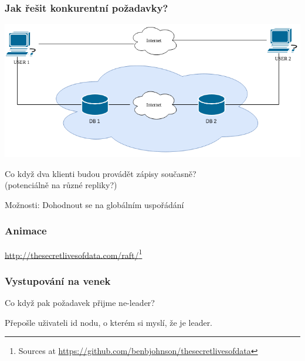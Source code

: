 \documentclass[usenames,dvipsnames,9pt]{beamer}
\begin{document}
\begin{frame}
  \frametitle{Jak řešit konkurentní požadavky?}

  \begin{center}
    \includegraphics[width=0.8\linewidth]{12/figs/pdv_cloud.png}

    \vspace{2em}

    {\Large Co když dva klienti budou provádět zápisy současně?} \\
    (potenciálně na různé repliky?)
  \end{center}

  Možnosti: \hspace{10pt} Dohodnout se na globálním uspořádání

  \pause
  \hspace{50pt}           %
\end{frame}

\begin{frame}
  \frametitle{Animace}
  \begin{center}
      \url{http://thesecretlivesofdata.com/raft/}\footnote{Sources at \url{https://github.com/benbjohnson/thesecretlivesofdata}}
  \end{center}
\end{frame}

\begin{frame}
  \frametitle{Vystupování na venek}
  \begin{center}
    \Large Co když pak požadavek přijme ne-leader?
    \pause

    Přepošle uživateli id nodu, o kterém si myslí, že je leader.
  \end{center}
\end{frame}
\end{document}
